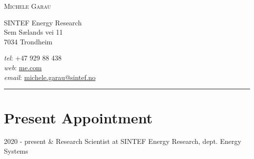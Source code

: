 \documentclass[11pt]{article}
\makeatletter
\newcommand{\myname}{Michele Garau}     %
\newcommand{\websiteurl}{{https://github.com/btskinner/tex_cv}} %
\newcommand{\websitename}{me.com}       %
\newcommand{\phone}{+47 929 88 438}       %
\newcommand{\email}{michele.garau@sintef.no}  %
\newcommand{\address}{                  %
  SINTEF Energy Research \\                    %
  Sem Sælands vei 11 \\                       %
  7034 Trondheim                        %
}
\makeatother
\begin{document}
\thispagestyle{first}


%

\hspace*{-\parindent}%
\begin{center}
  \vspace{-2em}
  {\LARGE\scshape \myname} \\
\end{center}
\begin{minipage}[t]{.6\linewidth}
\address
\end{minipage}
\hspace*{-\parindent}%
\begin{minipage}[t]{.43\linewidth}
\begin{flushright}
  \textit{tel}: \phone \\
  \textit{web}: \href{\websiteurl}{\websitename} \\
  \textit{email}: \href{mailto:\email}{\email}
\end{flushright}
\end{minipage}
\begin{center}
  \vspace{-.5em}
  \rule{\textwidth}{1pt}  
\end{center}



\section*{Present Appointment}
\begin{tabularx}{\linewidth}{\twocols}
  2020 - present & Research Scientist at SINTEF Energy Research, dept. Energy Systems \\
\end{tabularx}
\end{document}
